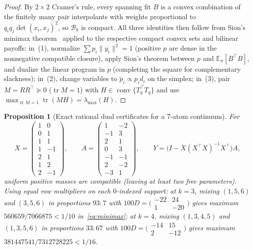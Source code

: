 \documentclass[11pt]{article}
\theoremstyle{plain}
\newtheorem{proposition}[theorem]{Proposition}
\theoremstyle{definition}
\theoremstyle{remark}
\DeclareMathOperator{\tr}{tr}
\DeclareMathOperator{\conv}{conv}
\begin{document}
\begin{proof}
By $2 \times 2$ Cramer's rule, every spanning fit $B$ is a convex combination of the finitely many pair interpolants with weights proportional to $q_i q_j \det(x_i, x_j)^2$, so $\mathcal{B}_k$ is compact.
All three identities then follow from Sion's minimax theorem~\cite{Sion1958} applied to the respective compact convex sets and bilinear payoffs:
in~(1), normalize $\sum p_i \|y_i\|^2 = 1$ (positive $p$ are dense in the nonnegative compatible closure), apply Sion's theorem between $p$ and $\mathbb{E}_\pi[B^\top B]$, and dualize the linear program in $p$ (completing the square for complementary slackness);
in~(2), change variables to $\tilde{p}_i \propto p_i d_i$ on the simplex;
in~(3), pair $M = RR^\top \succeq 0$ ($\tr M = 1$) with $H \in \conv\overline{\{T_q^\top T_q\}}$ and use $\max_{\tr M = 1}\tr(MH) = \lambda_{\max}(H)$.
\end{proof}

\begin{proposition}[Exact rational dual certificates for a 7-atom continuum]\label{prop:dual-cert}
For
\[
X = \begin{pmatrix} 1&0 \\ 0&1 \\ 1&1 \\ 1&-1 \\ 2&1 \\ 1&2 \\ 2&-1 \end{pmatrix}, \qquad
A = \begin{pmatrix} 1&-2 \\ -1&3 \\ 2&1 \\ 0&3 \\ -1&-1 \\ 2&-2 \\ -3&1 \end{pmatrix}, \qquad
Y = \bigl(I - X(X^\top X)^{-1}X^\top\bigr)A,
\]
uniform positive masses are compatible (leaving at least two free parameters). Using equal row multipliers on each $0$-indexed support: at $k=3$, mixing $(1,5,6)$ and $(3,5,6)$ in proportions $93:7$ with $100D = \bigl(\begin{smallmatrix}-22 & 24 \\ 1 & -20\end{smallmatrix}\bigr)$ gives maximum $560659/7066875 < 1/10$ in~\eqref{eq:minimax}; at $k=4$, mixing $(1,3,4,5)$ and $(1,3,5,6)$ in proportions $33:67$ with $100D = \bigl(\begin{smallmatrix}-14 & 15 \\ 2 & -12\end{smallmatrix}\bigr)$ gives maximum $381447541/7312728225 < 1/16$.
\end{proposition}
\end{document}
